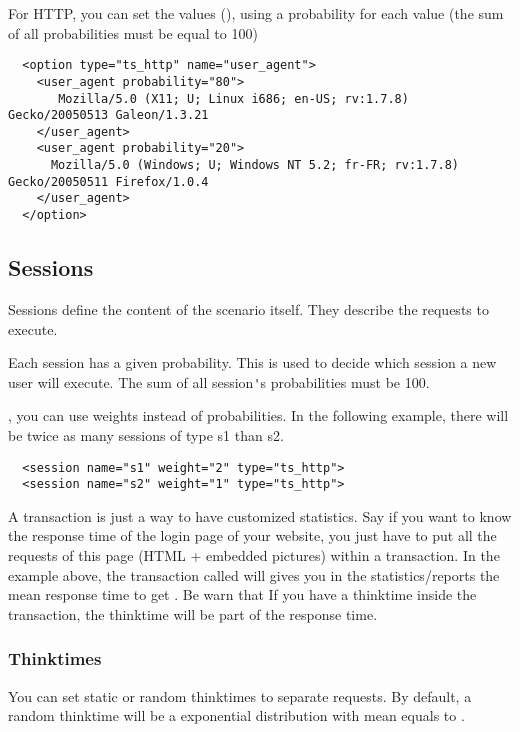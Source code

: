 \documentclass{TSUNG-en}
\begin{document}
For HTTP, you can set the  values
(), using a probability for each
value (the sum of all probabilities must be equal to 100)

\begin{Verbatim}
  <option type="ts_http" name="user_agent">
    <user_agent probability="80">
       Mozilla/5.0 (X11; U; Linux i686; en-US; rv:1.7.8) Gecko/20050513 Galeon/1.3.21
    </user_agent>
    <user_agent probability="20">
      Mozilla/5.0 (Windows; U; Windows NT 5.2; fr-FR; rv:1.7.8) Gecko/20050511 Firefox/1.0.4
    </user_agent>
  </option>
\end{Verbatim}

\subsection{Sessions}
\label{sec:sessions}

Sessions define the content of the scenario itself. They describe
the requests to execute.

Each session has a given probability. This is used to decide which
session a new user will execute. The sum of all session\verb|'|s
probabilities must be 100.

, you can use weights instead of
probabilities. In the following example, there will be twice as many
sessions of type s1 than s2.
\begin{Verbatim}
  <session name="s1" weight="2" type="ts_http">
  <session name="s2" weight="1" type="ts_http">
\end{Verbatim}


A transaction is just a way to have customized statistics. Say if you
want to know the response time of the login page of your website, you
just have to put all the requests of this page (HTML + embedded
pictures) within a transaction. In the example above, the transaction
called  will gives you in the
statistics/reports the mean response time to get
. Be warn that If you have a
thinktime inside the transaction, the thinktime will be part of the
response time.

\subsubsection{Thinktimes}

You can set static or random thinktimes to separate requests. By
default, a random thinktime will be a exponential distribution with
mean equals to .
\end{document}
